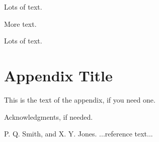 \documentclass[10pt, preprint]{sigplanconf}
\begin{document}
Lots of text.

More text.

Lots of text.

\appendix
\section{Appendix Title}

This is the text of the appendix, if you need one.

\acks

Acknowledgments, if needed.





\begin{thebibliography}{}
\softraggedright

P. Q. Smith, and X. Y. Jones. ...reference text...

\end{thebibliography}
\end{document}
